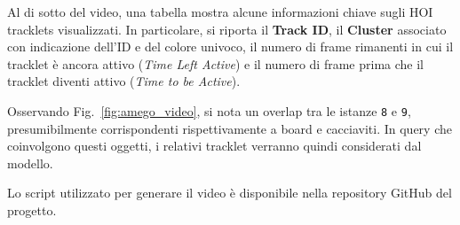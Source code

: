 Al di sotto del video, una tabella mostra alcune informazioni chiave sugli HOI tracklets visualizzati. In particolare, si riporta il \textbf{Track ID}, il \textbf{Cluster} associato con indicazione dell'ID e del colore univoco, il numero di frame rimanenti in cui il tracklet è ancora attivo (\textit{Time Left Active}) e il numero di frame prima che il tracklet diventi attivo (\textit{Time to be Active}).

Osservando Fig.~\ref{fig:amego_video}, si nota un overlap tra le istanze \texttt{8} e \texttt{9}, presumibilmente corrispondenti rispettivamente a board e cacciaviti. In query che coinvolgono questi oggetti, i relativi tracklet verranno quindi considerati dal modello.

Lo script utilizzato per generare il video è disponibile nella repository GitHub del progetto.

